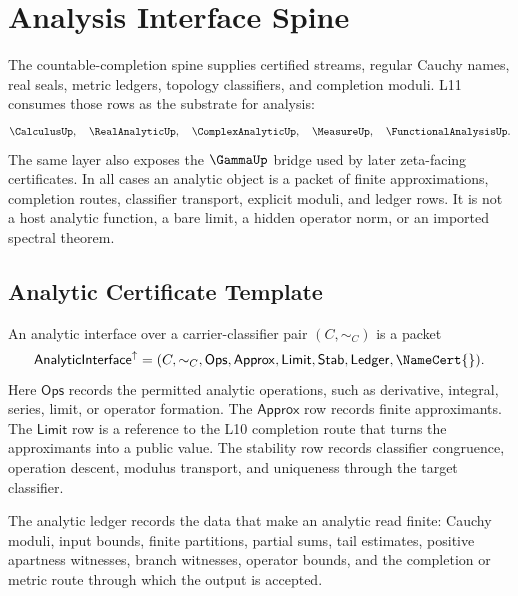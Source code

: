 \chapter{Analysis Interface Spine}
\label{ch:visions-analysis-interface-spine}

The countable-completion spine supplies certified streams, regular Cauchy
names, real seals, metric ledgers, topology classifiers, and completion
moduli.  L11 consumes those rows as the substrate for analysis:
$$
\CalculusUp,\quad
\RealAnalyticUp,\quad
\ComplexAnalyticUp,\quad
\MeasureUp,\quad
\FunctionalAnalysisUp.
$$
The same layer also exposes the $\GammaUp$ bridge used by later zeta-facing
certificates.  In all cases an analytic object is a packet of finite
approximations, completion routes, classifier transport, explicit moduli, and
ledger rows.  It is not a host analytic function, a bare limit, a hidden
operator norm, or an imported spectral theorem.

\section{Analytic Certificate Template}
\label{sec:analysis-spine-template}

\begin{definition}
\label{def:analysis-spine-interface}
An analytic interface over a carrier-classifier pair $(C,\sim_C)$ is a packet
$$
\mathsf{AnalyticInterface}^{\uparrow}
=
(C,\sim_C,\mathsf{Ops},\mathsf{Approx},\mathsf{Limit},
\mathsf{Stab},\mathsf{Ledger},\NameCert{}).
$$
Here $\mathsf{Ops}$ records the permitted analytic operations, such as
derivative, integral, series, limit, or operator formation.  The
$\mathsf{Approx}$ row records finite approximants.  The $\mathsf{Limit}$ row
is a reference to the L10 completion route that turns the approximants into a
public value.  The stability row records classifier congruence, operation
descent, modulus transport, and uniqueness through the target classifier.
\end{definition}

\begin{definition}
\label{def:analysis-spine-ledger}
The analytic ledger records the data that make an analytic read finite:
Cauchy moduli, input bounds, finite partitions, partial sums, tail estimates,
positive apartness witnesses, branch witnesses, operator bounds, and the
completion or metric route through which the output is accepted.
\end{definition}


